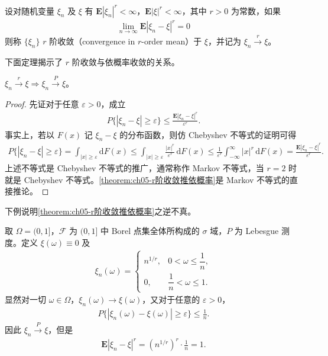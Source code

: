 \documentclass[../../main.tex]{subfiles}
\begin{document}
\begin{definition}[$r$ 阶收敛]\label{definition:ch05-r阶收敛}
设对随机变量 $\xi_n$ 及 $\xi$ 有 $\boldsymbol{E}|\xi_n|^{r}<\infty$，$\boldsymbol{E}|\xi|^{r}<\infty$，其中 $r>0$ 为常数，如果
\begin{align}
\lim_{n\to\infty}\boldsymbol{E}|\xi_n-\xi|^{r}=0
\end{align}
则称 $\{\xi_n\}$ $r$ 阶收敛（convergence in $r$-order mean）于 $\xi$，并记为 $\xi_n\xrightarrow{r}\xi$。
\end{definition}

下面定理揭示了 $r$ 阶收敛与依概率收敛的关系。

\begin{theorem}\label{theorem:ch05-r阶收敛推依概率}
$\xi_n\xrightarrow{r}\xi\Rightarrow\xi_n\xrightarrow{P}\xi$。
\end{theorem}

\begin{proof}
先证对于任意 $\varepsilon>0$，成立
\begin{align}
P\{|\xi_n-\xi|\geqslant\varepsilon\}\leqslant\frac{\boldsymbol{E}|\xi_n-\xi|^{r}}{\varepsilon^{r}}.
\end{align}
事实上，若以 $F(x)$ 记 $\xi_n-\xi$ 的分布函数，则仿 Chebyshev 不等式的证明可得
\begin{align*}
P\{|\xi_n-\xi|\geqslant\varepsilon\}
=\int_{|x|\geqslant\varepsilon}\mathrm{d}F(x)
\leqslant\int_{|x|\geqslant\varepsilon}\frac{|x|^{r}}{\varepsilon^{r}}\,\mathrm{d}F(x)
\leqslant\frac{1}{\varepsilon^{r}}\int_{-\infty}^{\infty}|x|^{r}\,\mathrm{d}F(x)
=\frac{\boldsymbol{E}|\xi_n-\xi|^{r}}{\varepsilon^{r}}.
\end{align*}
上述不等式是 Chebyshev 不等式的推广，通常称作 Markov 不等式，当 $r=2$ 时就是 Chebyshev 不等式。\cref{theorem:ch05-r阶收敛推依概率}是 Markov 不等式的直接推论。
\end{proof}

下例说明\cref{theorem:ch05-r阶收敛推依概率}之逆不真。

\begin{example}\label{example:ch05-依概率不r阶反例}
取 $\Omega=(0,1]$，$\mathscr{F}$ 为 $(0,1]$ 中 Borel 点集全体所构成的 $\sigma$ 域，$P$ 为 Lebesgue 测度。定义 $\xi(\omega)\equiv0$ 及
\begin{align}
\xi_n(\omega)=
\begin{cases}
n^{1/r},&0<\omega\leqslant\dfrac1n,\\
0,&\dfrac1n<\omega\leqslant1.
\end{cases}
\end{align}
显然对一切 $\omega\in\Omega$，$\xi_n(\omega)\to\xi(\omega)$，又对于任意的 $\varepsilon>0$，
\begin{align*}
P\{|\xi_n(\omega)-\xi(\omega)|\geqslant\varepsilon\}\leqslant\frac1n.
\end{align*}
因此 $\xi_n\xrightarrow{P}\xi$，但是
\begin{align*}
\boldsymbol{E}|\xi_n-\xi|^{r}=(n^{1/r})^{r}\cdot\frac1n=1.
\end{align*}
\end{example}
\end{document}
